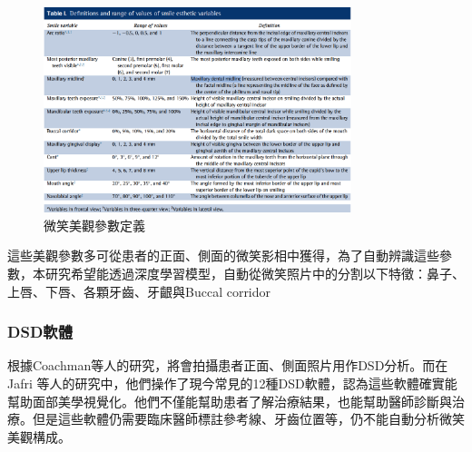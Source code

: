 \begin{figure}[H]
\centering
\includegraphics[width=0.8\textwidth]{paste_src/2023-02-05-22-20-04.png}
\caption{微笑美觀參數定義}
\label{}
\end{figure}

這些美觀參數多可從患者的正面、側面的微笑影相中獲得，為了自動辨識這些參數，本研究希望能透過深度學習模型，自動從微笑照片中的分割以下特徵：鼻子、上唇、下唇、各顆牙齒、牙齦與Buccal corridor



\subsubsection{DSD軟體}

根據Coachman等人的研究，將會拍攝患者正面、側面照片用作DSD分析。而在Jafri 等人的研究中，他們操作了現今常見的12種DSD軟體，認為這些軟體確實能幫助面部美學視覺化。他們不僅能幫助患者了解治療結果，也能幫助醫師診斷與治療。但是這些軟體仍需要臨床醫師標註參考線、牙齒位置等，仍不能自動分析微笑美觀構成。

